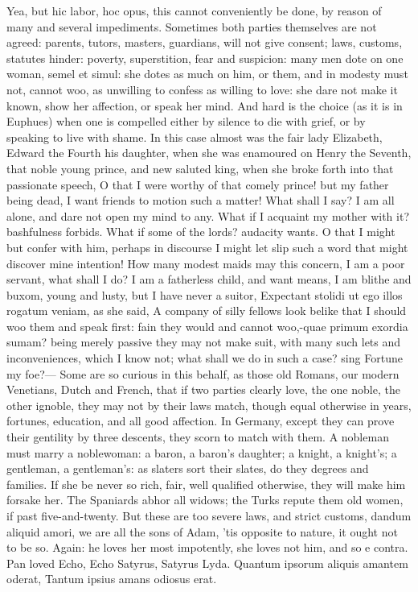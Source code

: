 {Yea, but hic labor, hoc opus, this cannot conveniently be done, by
reason of many and several impediments. Sometimes both parties
themselves are not agreed: parents, tutors, masters, guardians, will
not give consent; laws, customs, statutes hinder: poverty,
superstition, fear and suspicion: many men dote on one woman, semel et
simul: she dotes as much on him, or them, and in modesty must not,
cannot woo, as unwilling to confess as willing to love: she dare not
make it known, show her affection, or speak her mind. And hard is the
choice (as it is in Euphues) when one is compelled either by silence to
die with grief, or by speaking to live with shame. In this case almost
was the fair lady Elizabeth, Edward the Fourth his daughter, when she
was enamoured on Henry the Seventh, that noble young prince, and new
saluted king, when she broke forth into that passionate speech, 
O that I were worthy of that comely prince! but my father being dead, I
want friends to motion such a matter! What shall I say? I am all alone,
and dare not open my mind to any. What if I acquaint my mother with it?
bashfulness forbids. What if some of the lords? audacity wants. O that
I might but confer with him, perhaps in discourse I might let slip such
a word that might discover mine intention! How many modest maids may
this concern, I am a poor servant, what shall I do? I am a fatherless
child, and want means, I am blithe and buxom, young and lusty, but I
have never a suitor, Expectant stolidi ut ego illos rogatum veniam, as
she said, A company of silly fellows look belike that I should
woo them and speak first: fain they would and cannot woo,-quae
primum exordia sumam? being merely passive they may not make suit, with
many such lets and inconveniences, which I know not; what shall we do
in such a case? sing Fortune my foe?---
Some are so curious in this behalf, as those old Romans, our modern
Venetians, Dutch and French, that if two parties clearly love, the one
noble, the other ignoble, they may not by their laws match, though
equal otherwise in years, fortunes, education, and all good affection.
In Germany, except they can prove their gentility by three descents,
they scorn to match with them. A nobleman must marry a noblewoman: a
baron, a baron's daughter; a knight, a knight's; a gentleman, a
gentleman's: as slaters sort their slates, do they degrees and
families. If she be never so rich, fair, well qualified otherwise, they
will make him forsake her. The Spaniards abhor all widows; the Turks
repute them old women, if past five-and-twenty. But these are too
severe laws, and strict customs, dandum aliquid amori, we are all the
sons of Adam, 'tis opposite to nature, it ought not to be so. Again: he
loves her most impotently, she loves not him, and so e contra.
Pan loved Echo, Echo Satyrus, Satyrus Lyda.
Quantum ipsorum aliquis amantem oderat,
Tantum ipsius amans odiosus erat.

}
